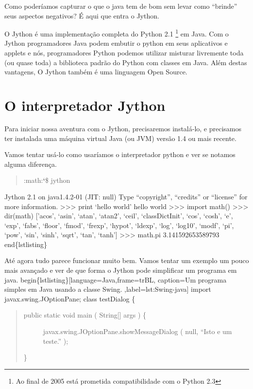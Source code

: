 \documentclass[a4paper,10pt,brazil]{sphinxmanual}
\begin{document}
Como poderíamos capturar o que o java tem de bom sem levar como
``brinde'' seus aspectos negativos? É aqui que entra o Jython.

O Jython é uma implementação completa do Python 2.1 \footnote{
Ao final de 2005 está prometida compatibilidade com o Python 2.3
} em Java.
Com o Jython programadores Java podem embutir o python em seus
aplicativos e applets e nós, programadores Python podemos utilizar
misturar livremente toda (ou quase toda) a biblioteca padrão do
Python com classes em Java. Além destas vantagens, O Jython também
é uma linguagem Open Source.


\chapter{O interpretador Jython}
\label{jython:o-interpretador-jython}\label{jython::doc}
Para iniciar nossa aventura com o Jython, precisaremos instalá-lo,
e precisamos ter instalada uma máquina virtual Java (ou JVM) versão
1.4 ou mais recente.

Vamos tentar usá-lo como usaríamos o interpretador python e ver se
notamos alguma diferença.
\begin{quote}

:math:{\color{red}\bfseries{}{}`}\$ jython
\end{quote}

Jython 2.1 on java1.4.2-01 (JIT: null)
Type ``copyright'', ``credits'' or ``license'' for more information.
\textgreater{}\textgreater{}\textgreater{} print `hello world'
hello world
\textgreater{}\textgreater{}\textgreater{} import math()
\textgreater{}\textgreater{}\textgreater{} dir(math)
{[}'acos', `asin', `atan', `atan2', `ceil', `classDictInit', `cos', `cosh', `e', `exp', `fabs', `floor', `fmod', `frexp', `hypot', `ldexp', `log', `log10', `modf', `pi', `pow', `sin', `sinh', `sqrt', `tan', `tanh'{]}
\textgreater{}\textgreater{}\textgreater{} math.pi
3.141592653589793
end\{lstlisting\}

Até agora tudo parece funcionar muito bem. Vamos tentar um exemplo um pouco mais avançado e ver de que forma o Jython pode simplificar um programa em java.
begin\{lstlisting\}{[}language=Java,frame=trBL, caption=Um programa simples em Java usando a classe Swing. ,label=lst:Swing-java{]}
import javax.swing.JOptionPane;
class testDialog \{
\begin{quote}
\begin{description}
\item[{public static void main ( String{[}{]} args ) \{}] \leavevmode
javax.swing.JOptionPane.showMessageDialog ( null, ``Isto e um teste.'' );

\end{description}

\}
\end{quote}
\end{document}
